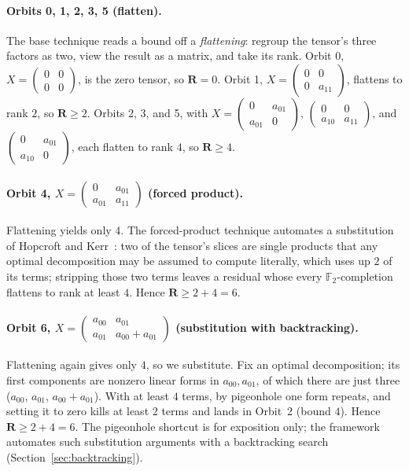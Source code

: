 \documentclass[11pt]{article}
\theoremstyle{definition}
\newcommand{\F}{\mathbb{F}}
\newcommand{\R}{\mathbf{R}}
\begin{document}
\paragraph{Orbits 0, 1, 2, 3, 5 (flatten).} The base technique reads a bound off a
\emph{flattening}: regroup the tensor's three factors as two, view the result as a
matrix, and take its rank. Orbit 0, $X=\left(
  \begin{smallmatrix}0&0\\0&0
\end{smallmatrix}\right)$, is the zero tensor, so
$\R=0$. Orbit 1, $X=\left(
  \begin{smallmatrix}0&0\\0&a_{11}
\end{smallmatrix}\right)$, flattens to rank $2$,
so $\R\ge 2$. Orbits 2, 3, and 5, with $X=\left(
  \begin{smallmatrix}0&a_{01}\\a_{01}&0
\end{smallmatrix}\right)$, $\left(
  \begin{smallmatrix}0&0\\a_{10}&a_{11}
\end{smallmatrix}\right)$, and $\left(
  \begin{smallmatrix}0&a_{01}\\a_{10}&0
\end{smallmatrix}\right)$, each flatten to
rank $4$, so $\R\ge 4$.

\paragraph{Orbit 4, $X=\left(
    \begin{smallmatrix}0&a_{01}\\a_{01}&a_{11}
\end{smallmatrix}\right)$ (forced product).}
Flattening yields only $4$. The forced-product technique automates a substitution of
Hopcroft and Kerr~\cite{hopcroft1971minimizing}: two of the tensor's slices are single
products that any optimal decomposition may be assumed to compute literally, which uses
up $2$ of its terms; stripping those two terms leaves a residual whose every
$\F_2$-completion flattens to rank at least $4$. Hence $\R\ge 2+4=6$.

\paragraph{Orbit 6, $X=\left(
    \begin{smallmatrix}a_{00}&a_{01}\\a_{01}&a_{00}+a_{01}
\end{smallmatrix}\right)$ (substitution with backtracking).}
Flattening again gives only $4$, so we substitute. Fix an optimal decomposition; its
first components are nonzero linear forms in $a_{00},a_{01}$, of which there are just
three ($a_{00}$, $a_{01}$, $a_{00}+a_{01}$). With at least $4$ terms, by pigeonhole one
form repeats, and setting it to zero kills at least $2$ terms and lands in Orbit~2
(bound $4$). Hence $\R\ge 2+4=6$. The pigeonhole shortcut is for exposition only;
the framework automates such substitution arguments with a backtracking search
(Section~\ref{sec:backtracking}).
\end{document}
